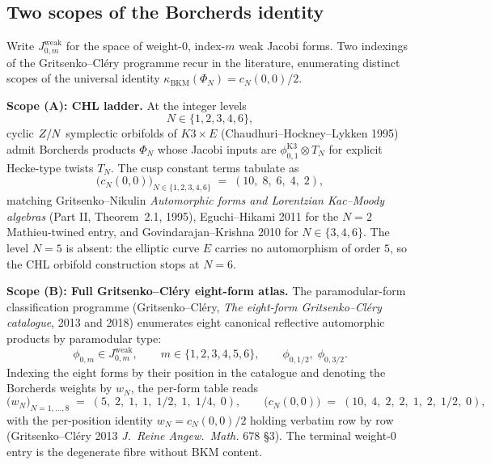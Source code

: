 \subsection{Two scopes of the Borcherds identity}

Write $J_{0, m}^{\mathrm{weak}}$ for the space of weight-$0$, index-$m$ weak Jacobi forms. Two indexings of the Gritsenko--Cl\'ery programme recur in the literature, enumerating distinct scopes of the universal identity $\kappa_{\mathrm{BKM}}(\Phi_N) = c_N(0, 0)/2$.

\textbf{Scope (A): CHL ladder.} At the integer levels
\[
  N \in \{1, 2, 3, 4, 6\},
\]
cyclic $Z/N$ symplectic orbifolds of $K3 \times E$ (Chaudhuri--Hockney--Lykken 1995) admit Borcherds products $\Phi_N$ whose Jacobi inputs are $\phi_{0, 1}^{\mathrm{K3}} \otimes T_N$ for explicit Hecke-type twists $T_N$. The cusp constant terms tabulate as
\begin{equation}
  \bigl(c_N(0, 0)\bigr)_{N \in \{1, 2, 3, 4, 6\}} \;=\; (10, \; 8, \; 6, \; 4, \; 2),
  \label{eq:cn-zero-chl}
\end{equation}
matching Gritsenko--Nikulin \emph{Automorphic forms and Lorentzian Kac--Moody algebras} (Part II, Theorem~2.1, 1995), Eguchi--Hikami 2011 for the $N = 2$ Mathieu-twined entry, and Govindarajan--Krishna 2010 for $N \in \{3, 4, 6\}$. The level $N = 5$ is absent: the elliptic curve $E$ carries no automorphism of order $5$, so the CHL orbifold construction stops at $N = 6$.

\textbf{Scope (B): Full Gritsenko--Cl\'ery eight-form atlas.} The paramodular-form classification programme (Gritsenko--Cl\'ery, \emph{The eight-form Gritsenko--Cl\'ery catalogue}, 2013 and 2018) enumerates eight canonical reflective automorphic products by paramodular type:
\[
  \phi_{0, m} \in J_{0, m}^{\mathrm{weak}}, \qquad m \in \{1, 2, 3, 4, 5, 6\}, \qquad \phi_{0, 1/2}, \; \phi_{0, 3/2}.
\]
Indexing the eight forms by their position in the catalogue and denoting the Borcherds weights by $w_N$, the per-form table reads
\begin{equation}
  \bigl(w_N\bigr)_{N = 1, \ldots, 8} \;=\; (5, \; 2, \; 1, \; 1, \; 1/2, \; 1, \; 1/4, \; 0), \qquad \bigl(c_N(0, 0)\bigr) \;=\; (10, \; 4, \; 2, \; 2, \; 1, \; 2, \; 1/2, \; 0),
  \label{eq:cn-zero-gc-atlas}
\end{equation}
with the per-position identity $w_N = c_N(0, 0)/2$ holding verbatim row by row (Gritsenko--Cl\'ery 2013 \emph{J.\ Reine Angew.\ Math.} 678 \S 3). The terminal weight-$0$ entry is the degenerate fibre without BKM content.

